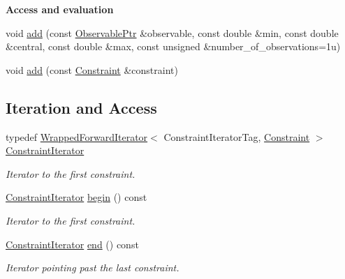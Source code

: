 \begin{Indent}{\bf Access and evaluation}\par
{\em \label{_amgrp6134b2a17e0234f8ef026e8f586768aa}
 }\begin{DoxyCompactItemize}
\item 
void \hyperlink{classeos_1_1LogLikelihood_a236d8123a08805e1d825ca262bada0c8}{add} (const \hyperlink{namespaceeos_a470e5dd806bd129080f1aa0c2954646f}{ObservablePtr} \&observable, const double \&min, const double \&central, const double \&max, const unsigned \&number\_\-of\_\-observations=1u)
\item 
void \hyperlink{classeos_1_1LogLikelihood_ac1fd5ffc7ace637eab0d8a3fa5cb7463}{add} (const \hyperlink{classeos_1_1Constraint}{Constraint} \&constraint)
\end{DoxyCompactItemize}
\end{Indent}
\subsection*{Iteration and Access}
\label{_amgrp518e849dad280496b3dba5bda3151948}
 \begin{DoxyCompactItemize}
\item 
typedef \hyperlink{classeos_1_1WrappedForwardIterator}{WrappedForwardIterator}$<$ ConstraintIteratorTag, \hyperlink{classeos_1_1Constraint}{Constraint} $>$ \hyperlink{classeos_1_1LogLikelihood_a48b422865426d34047c9757e2d5f4f92}{ConstraintIterator}
\begin{DoxyCompactList}\small\item\em Iterator to the first constraint. \item\end{DoxyCompactList}\item 
\hyperlink{classeos_1_1WrappedForwardIterator}{ConstraintIterator} \hyperlink{classeos_1_1LogLikelihood_aa016da72e3b65c8a4ed58cebf1f50863}{begin} () const 
\begin{DoxyCompactList}\small\item\em Iterator to the first constraint. \item\end{DoxyCompactList}\item 
\hyperlink{classeos_1_1WrappedForwardIterator}{ConstraintIterator} \hyperlink{classeos_1_1LogLikelihood_a15bf635f6541e9fb16463c5dbb4b462b}{end} () const 
\begin{DoxyCompactList}\small\item\em Iterator pointing past the last constraint. \item\end{DoxyCompactList}\end{DoxyCompactItemize}


